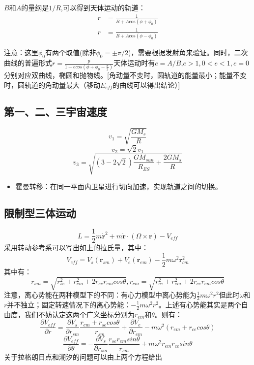 \documentclass[a4paper, 10pt, openany]{book}%
\begin{document}
    $B$和$A$的量纲是$1/R$,可以得到天体运动的轨道：
    \begin{align}r&=\frac{1}{B+A\mathrm{cos}(\phi+\phi_0)}\\
      r&=\frac{1}{B+A\mathrm{cos}(\phi-\phi_0)}\end{align}

    注意：这里$\phi_0$有两个取值(除非$\phi_0=\pm\pi/2$)，需要根据发射角来验证。同时，二次曲线的普遍形式$r=\frac{p}{1+ecos({\phi+\phi_0-\frac{\pi}{2}})}$天体运动时有$e=A/B$,$e>1,0<e<1,e=0$分别对应双曲线，椭圆和抛物线。[角动量不变时，圆轨道的能量最小；能量不变时，圆轨道的角动量最大（移动$E_{eff}$的曲线可以得出结论）]
    \subsection{第一、二、三宇宙速度}
    $$v_1=\sqrt{\frac{GM_s}{R}}$$
    $$v_2=\sqrt{2}v_1$$
    $$v_3=\sqrt{(3-2\sqrt{2})\frac{GM_{sun}}{R_{ES}}+\frac{2GM_s}{R}}$$
    
    \begin{itemize}
    \item 霍曼转移：在同一平面内卫星进行切向加速，实现轨道之间的切换。
    \end{itemize}
    
    
    
    \subsection{限制型三体运动}
    $$L=\frac{1}{2}m\dot{\textbf{r}}^2+m\dot{\textbf{r}}\cdot(\Omega \times{\textbf{r}})-V_{eff}$$
    采用转动参考系可以写出如上的拉氏量，其中：
    $$V_{eff}=V_s(\textbf{r}_{sm})+V_e(\textbf{r}_{em})-\frac{1}{2}m\omega^2\textbf{r}_{cm}^2$$
    其中有：
    $$r_{sm}=\sqrt{r^2_{se}+r^2_{em}+2r_{se}r_{em}cos\theta},r_{cm}=\sqrt{r^2_{ce}+r^2_{em}+2r_{ce}r_{em}cos\theta}$$
    注意，离心势能在两种模型下的不同：有心力模型中离心势能为$\frac{1}{2}m\omega^2r^2$但此时$\omega$和$r$并不独立；固定转速情况下的离心势能：$-\frac{1}{2}m\omega^2r^2$。上述有心势能其实是两个自由度，我们不妨认定这两个广义坐标分别为$r_{em}$和$\theta$。则有：
    $$\frac{\partial V_{eff}}{\partial r}=\frac{\partial V_s}{\partial r_{sm}}\frac{r_{em}+r_{se}cos\theta}{r_{sm}}+\frac{\partial V_e}{\partial r_{em}}-m\omega^2(r_{em}+r_{ce}cos\theta)$$
    $$\frac{\partial V_{eff}}{\partial \theta}=-\frac{\partial V_s}{\partial r_{sm}}\frac{r_{se}r_{em}sin\theta}{r_{sm}}+m\omega^2r_{em}r_{ce}sin\theta$$
    关于拉格朗日点和潮汐的问题可以由上两个方程给出
\end{document}
